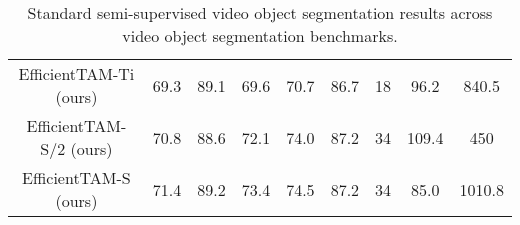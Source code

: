 \begin{table*}[t]
{\begin{tabular}{c|cccc|c|c|c|c}
\rowcolor{gray} EfficientTAM-Ti (ours)   & 69.3                                                & 89.1                                                     & 69.6                                               & 70.7                                                & 86.7                                                     & 18                                                                        & 96.2  & 840.5        \\
\rowcolor{gray} EfficientTAM-S/2 (ours)  & 70.8                                                & 88.6                                                     & 72.1                                               & 74.0                                                & 87.2                                                     & 34                                                                        & 109.4 & 450          \\
\rowcolor{gray} EfficientTAM-S (ours)    & 71.4                                                & 89.2                                                     & 73.4                                               & 74.5                                                & 87.2                                                     & 34                                                                        & 85.0  & 1010.8       \\ \hline
\end{tabular}}
\caption{Standard semi-supervised video object segmentation results across video object segmentation benchmarks.}
\label{tab:vos}
\end{table*}